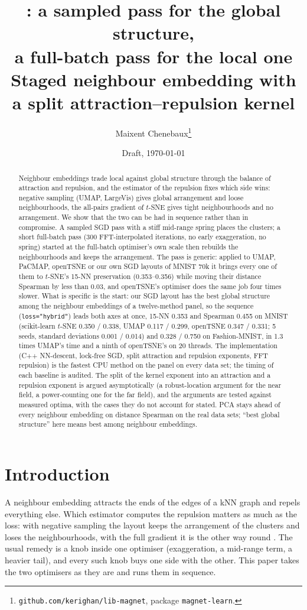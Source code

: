 \documentclass[11pt]{article}
\title{\magnet: a sampled pass for the global structure,\\ a full-batch pass for the local one\\
\large Staged neighbour embedding with a split attraction--repulsion kernel}
\author{Maixent Chenebaux\thanks{\texttt{github.com/kerighan/lib-magnet}, package \texttt{magnet-learn}.}}
\date{Draft, \today}
\begin{document}
\maketitle

\begin{abstract}
Neighbour embeddings trade local against global structure through the balance of attraction and
repulsion, and the estimator of the repulsion fixes which side wins: negative sampling (UMAP, LargeVis)
gives global arrangement and loose neighbourhoods, the all-pairs gradient of $t$-SNE gives tight
neighbourhoods and no arrangement. We show that the two can be had in sequence rather than in
compromise. A sampled SGD pass with a stiff mid-range spring places the clusters; a short full-batch
pass (300 FFT-interpolated iterations, no early exaggeration, no spring) started at the full-batch
optimiser's own scale then rebuilds the neighbourhoods and keeps the arrangement. The pass is
generic: applied to UMAP, PaCMAP, openTSNE or our own SGD layouts of MNIST 70k it brings every one
of them to $t$-SNE's 15-NN preservation (0.353--0.356) while moving their distance Spearman by less
than 0.03, and openTSNE's optimiser does the same job four times slower. What is specific is the
start: our SGD layout has the best global structure among the neighbour embeddings of a twelve-method
panel, so the sequence (\texttt{loss="hybrid"}) leads both axes at once, 15-NN 0.353 and Spearman
0.455 on MNIST (scikit-learn $t$-SNE 0.350 / 0.338, UMAP 0.117 / 0.299, openTSNE 0.347 / 0.331; 5
seeds, standard deviations 0.001 / 0.014) and 0.328 / 0.750 on Fashion-MNIST, in 1.3 times UMAP's
time and a ninth of openTSNE's on 20 threads. The implementation (C++ NN-descent, lock-free SGD, split
attraction and repulsion exponents, FFT repulsion) is the fastest CPU method on the panel on every data
set; the timing of each baseline is audited. The split of the kernel exponent into an attraction and a
repulsion exponent is argued asymptotically (a robust-location argument for the near field, a
power-counting one for the far field), and the arguments are tested against measured optima, with the
cases they do not account for stated. PCA stays ahead of every neighbour embedding on distance
Spearman on the real data sets; ``best global structure'' here means best among neighbour embeddings.
\end{abstract}

\section{Introduction}
A neighbour embedding attracts the ends of the edges of a kNN graph and repels everything else. Which
estimator computes the repulsion matters as much as the loss: with negative sampling the layout keeps
the arrangement of the clusters and loses the neighbourhoods, with the full gradient it is the other
way round \citep{boehm2022attraction, damrich2021umap}. The usual remedy is a knob inside one
optimiser (exaggeration, a mid-range term, a heavier tail), and every such knob buys one side with the
other. This paper takes the two optimisers as they are and runs them in sequence.
\end{document}
